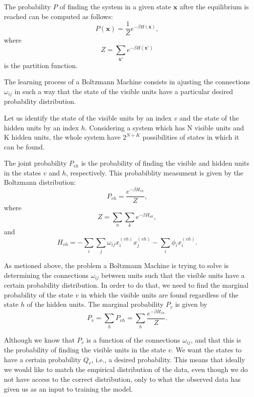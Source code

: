The probability $P$ of finding the system in a given state $\mathbf{x}$ after the equilibrium is reached can be computed as follows:
\begin{equation}
  P(\mathbf{x}) = \frac{1}{Z} e^{-\beta H(\mathbf{x})},
  \label{eq:eq6}
\end{equation}
where
\begin{equation}
  Z = \sum_{\mathbf{x}'} e^{-\beta H(\mathbf{x}')}
  \label{eq:eq7}
\end{equation}
is the partition function.

The learning process of a Boltzmann Machine consists in ajusting the connections $\omega_{ij}$ in such a way that the state of the visible units have a particular desired probability distribution.

Let us identify the state of the visible units by an index $v$ and the state of the hidden units by an index $h$.
Considering a system which has N visible units and K hidden units, the whole system have $2^{N + K}$ possibilities of states in which it can be found.

The joint probability $P_{vh}$ is the probability of finding the visible and hidden units in the states $v$ and $h$, respectively.
This probabiblity measument is given by the Boltzmann distribution:
\begin{equation}
  P_{vh} = \frac{e^{-\beta H_{vh}}}{Z},
  \label{eq:eq8}
\end{equation}
where
\begin{equation}
  Z = \sum_{u} \sum_{k} e^{-\beta H_{uk}},
  \label{eq:eq9}
\end{equation}
and
\begin{equation}
  H_{vh} = - \sum_{i} \sum_{j} \omega_{ij} x^{(vh)}_{i} x^{(vh)}_{j} - \sum_{i} \phi_{i} x^{(vh)}_{i}.
  \label{eq:eq10}
\end{equation}

As metioned above, the problem a Boltzmann Machine is trying to solve is determining the connections $\omega_{ij}$ between units such that the visible units have a certain probability distribution.
In order to do that, we need to find the marginal probability of the state $v$ in which the visible units are found regardless of the state $h$ of the hidden units. The marginal probability $P_{v}$ is given by
\begin{equation}
  P_{v} = \sum_{h} P_{vh} = \sum_{h} \frac{e^{-\beta H_{vh}}}{Z}.
  \label{eq:marginal_prob}
\end{equation}

Although we know that $P_{v}$ is a function of the connections $\omega_{ij}$, and that this is the probability of finding the visible units in the state $v$. We want the states to have a certain probability $Q_{v}$, i.e., a desired probability.
This means that ideally we would like to match the empirical distribution of the data, even though we do not have access to the correct distribution, only to what the observed data has given us as an input to training the model.

